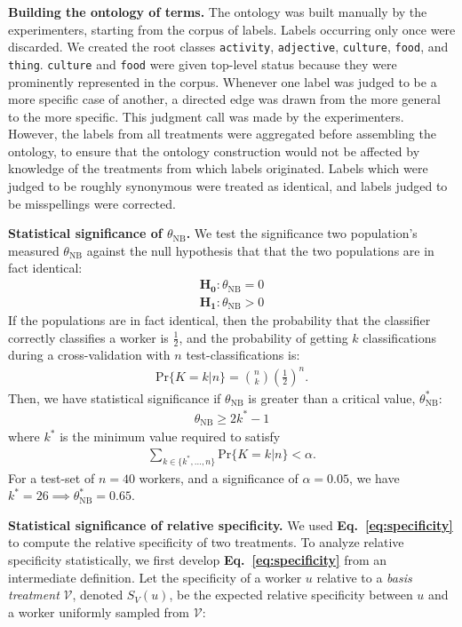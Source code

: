 \documentclass[a4paper]{report}
\begin{document}
\textbf{Building the ontology of terms.}  The ontology was built manually
by the experimenters, starting from the corpus of labels. Labels occurring only 
once were discarded.  We created the root classes \texttt{activity}, 
\texttt{adjective}, \texttt{culture}, 
\texttt{food}, and \texttt{thing}. \texttt{culture} and \texttt{food} were 
given top-level status because they were prominently represented in the corpus.
Whenever one label was judged to be a more specific case of another, a
directed edge was drawn from the more general to the more specific. This
judgment call was made by the experimenters.  However, the labels from all 
treatments were aggregated before assembling the ontology,  to 
ensure that the ontology construction would not be affected by 
knowledge of the treatments from which labels originated. 
Labels which were judged to be roughly synonymous were treated as identical,
and labels judged to be misspellings were corrected. 

\textbf{Statistical significance of $\theta_\text{NB}$.}
We test the significance two population's measured $\theta_\text{NB}$ against 
the null hypothesis that that the two populations are in fact identical:
\begin{align}
	\mathbf{H_0}: \theta_\text{NB} = 0 \\
	\mathbf{H_1}: \theta_\text{NB} > 0
\end{align}
If the populations are in fact identical, then the probability that the 
classifier correctly classifies a worker is $\frac{1}{2}$, and the probability 
of getting $k$ classifications during a cross-validation with $n$ 
test-classifications is:
\begin{align}
	\text{Pr}\{K = k | n \} = { n \choose k } \left(\frac{1}{2}\right)^n.
\end{align}
Then, we have statistical significance if 
$\theta_\text{NB}$ is greater than a critical value, 
$\theta_\text{NB}^*$:
\begin{align}
	\theta_\text{NB} \geq 2k^* - 1
\end{align}
where $k^*$ is the minimum value required to satisfy
\begin{align}
	\sum_{k \in \{k^*, \dots, n\}} \text{Pr}\{K = k | n \} < \alpha.
\end{align}
For a test-set of $n=40$ workers, and a significance of $\alpha = 0.05$, we
have $k^*=26 \implies \theta_\text{NB}^* = 0.65$.






\textbf{Statistical significance of relative specificity.}
We used \textbf{Eq.~\ref{eq:specificity}} to compute the relative specificity
of two treatments.  To analyze relative specificity statistically,
we first develop \textbf{Eq.~\ref{eq:specificity}} from an intermediate 
definition.  Let the specificity of a worker $u$ relative to a 
\textit{basis treatment} $\mathcal{V}$, denoted $S_V(u)$, be the expected 
relative specificity between $u$ and a worker uniformly sampled from 
$\mathcal{V}$:
\end{document}
